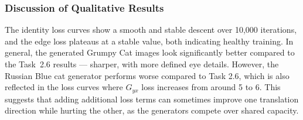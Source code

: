 \documentclass[11pt,a4paper]{article}
\begin{document}
\subsubsection*{Discussion of Qualitative Results}

The identity loss curves show a smooth and stable descent over 10,000 iterations, and the edge loss plateaus at a stable value, both indicating healthy training. In general, the generated Grumpy Cat images look significantly better compared to the Task~2.6 results --- sharper, with more defined eye details. However, the Russian Blue cat generator performs worse compared to Task 2.6, which is also reflected in the loss curves where $G_{yx}$ loss increases from around 5 to 6. This suggests that adding additional loss terms can sometimes improve one translation direction while hurting the other, as the generators compete over shared capacity.

\end{document}
